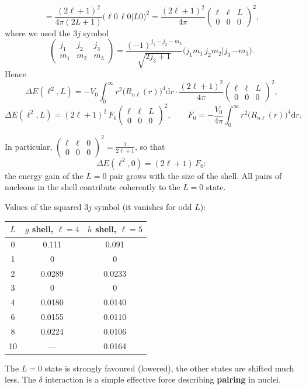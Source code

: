 \documentclass[11pt,a4paper]{article}
\newcommand{\ud}{\mathrm{d}}
\begin{document}
\[
=\frac{(2\ell+1)^2}{4\pi(2L+1)}\big(\ell0\,\ell0\big|L0\big)^2=\frac{(2\ell+1)^2}{4\pi}\begin{pmatrix}\ell&\ell&L\\0&0&0\end{pmatrix}^2,
\]
where we used the 3$j$ symbol
\[
\begin{pmatrix}j_1&j_2&j_3\\m_1&m_2&m_3\end{pmatrix}=\frac{(-1)^{j_1-j_2-m_3}}{\sqrt{2j_3+1}}\big(j_1m_1\,j_2m_2\big|j_3\,{-m_3}\big).
\]
Hence
\[
\Delta E(\ell^2,L)=-V_0\int_0^\infty r^2\big(R_{n\ell}(r)\big)^4\ud r\cdot\frac{(2\ell+1)^2}{4\pi}\begin{pmatrix}\ell&\ell&L\\0&0&0\end{pmatrix}^2,
\]
\[
\boxed{\Delta E(\ell^2,L)=(2\ell+1)^2\,F_0\begin{pmatrix}\ell&\ell&L\\0&0&0\end{pmatrix}^2},
\qquad
F_0=-\frac{V_0}{4\pi}\int_0^\infty r^2\big(R_{n\ell}(r)\big)^4\ud r .
\]

In particular, $\begin{pmatrix}\ell&\ell&0\\0&0&0\end{pmatrix}^2=\frac{1}{2\ell+1}$, so that
\[
\Delta E(\ell^2,0)=(2\ell+1)\,F_0 :
\]
the energy gain of the $L=0$ pair grows with the size of the shell. All pairs of nucleons in the shell contribute coherently to the $L=0$ state.

Values of the squared 3$j$ symbol (it vanishes for odd $L$):
\begin{center}
\begin{tabular}{c c c}
$L$ & $g$ shell, $\ell=4$ & $h$ shell, $\ell=5$\\ \hline
0 & 0.111 & 0.091\\
1 & 0 & 0\\
2 & 0.0289 & 0.0233\\
3 & 0 & 0\\
4 & 0.0180 & 0.0140\\
6 & 0.0155 & 0.0110\\
8 & 0.0224 & 0.0106\\
10 & --- & 0.0164
\end{tabular}
\end{center}
The $L=0$ state is strongly favoured (lowered), the other states are shifted much less. The $\delta$ interaction is a simple effective force describing \textbf{pairing} in nuclei.
\end{document}
